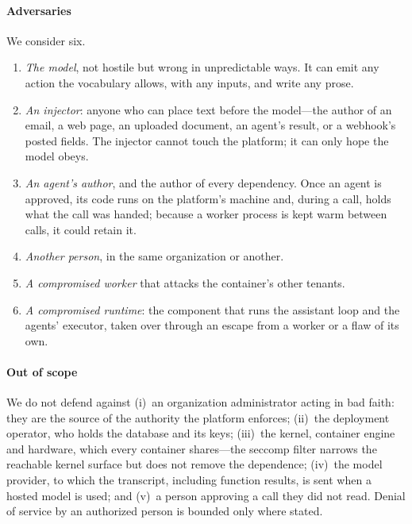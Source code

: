 \paragraph{Adversaries}
We consider six.
\begin{enumerate}[label=A\arabic*.,leftmargin=2em]
\item \emph{The model}, not hostile but wrong in unpredictable ways. It
  can emit any action the vocabulary allows, with any inputs, and write
  any prose.
\item \emph{An injector}: anyone who can place text before the
  model---the author of an email, a web page, an uploaded document, an
  agent's result, or a webhook's posted fields. The injector cannot
  touch the platform; it can only hope the model obeys.
\item \emph{An agent's author}, and the author of every dependency. Once
  an agent is approved, its code runs on the platform's machine and,
  during a call, holds what the call was handed; because a worker
  process is kept warm between calls, it could retain it.
\item \emph{Another person}, in the same organization or another.
\item \emph{A compromised worker} that attacks the container's other
  tenants.
\item \emph{A compromised runtime}: the component that runs the
  assistant loop and the agents' executor, taken over through an
  escape from a worker or a flaw of its own.
\end{enumerate}

\paragraph{Out of scope}
We do not defend against (i)~an organization administrator acting in
bad faith: they are the source of the authority the platform enforces;
(ii)~the deployment operator, who holds the database and its keys;
(iii)~the kernel, container engine and hardware, which every container
shares---the seccomp filter narrows the reachable kernel surface but
does not remove the dependence; (iv)~the model provider, to which the
transcript, including function results, is sent when a hosted model is
used; and (v)~a person approving a call they did not read. Denial of
service by an authorized person is bounded only where stated.

